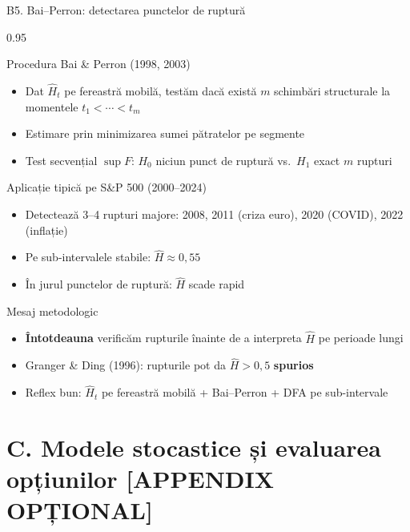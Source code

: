 \documentclass[9pt, aspectratio=169, t]{beamer}
\begin{document}
\begin{frame}[shrink=15]{B5. Bai--Perron: detectarea punctelor de ruptură}
\begin{cminipage}{0.95\textwidth}
\begin{block}{Procedura Bai \& Perron (1998, 2003)}
\begin{itemize}\setlength{\itemsep}{0pt}
    \item Dat $\hat H_t$ pe fereastră mobilă, testăm dacă există $m$ schimbări structurale la momentele $t_1<\cdots<t_m$
    \item Estimare prin minimizarea sumei pătratelor pe segmente
    \item Test secvențial $\sup F$: $H_0$ niciun punct de ruptură vs.\ $H_1$ exact $m$ rupturi
\end{itemize}
\end{block}
\begin{exampleblock}{Aplicație tipică pe S\&P 500 (2000--2024)}
\begin{itemize}\setlength{\itemsep}{0pt}
    \item Detectează 3--4 rupturi majore: 2008, 2011 (criza euro), 2020 (COVID), 2022 (inflație)
    \item Pe sub-intervalele stabile: $\hat H\approx 0{,}55$
    \item În jurul punctelor de ruptură: $\hat H$ scade rapid
\end{itemize}
\end{exampleblock}
\begin{alertblock}{Mesaj metodologic}
\begin{itemize}\setlength{\itemsep}{0pt}
    \item \textbf{Întotdeauna} verificăm rupturile înainte de a interpreta $\hat H$ pe perioade lungi
    \item Granger \& Ding (1996): rupturile pot da $\hat H>0{,}5$ \textbf{spurios}
    \item Reflex bun: $\hat H_t$ pe fereastră mobilă + Bai--Perron + DFA pe sub-intervale
\end{itemize}
\end{alertblock}
\end{cminipage}
\end{frame}

\section*{C. Modele stocastice și evaluarea opțiunilor [APPENDIX OPȚIONAL]}
\end{document}

